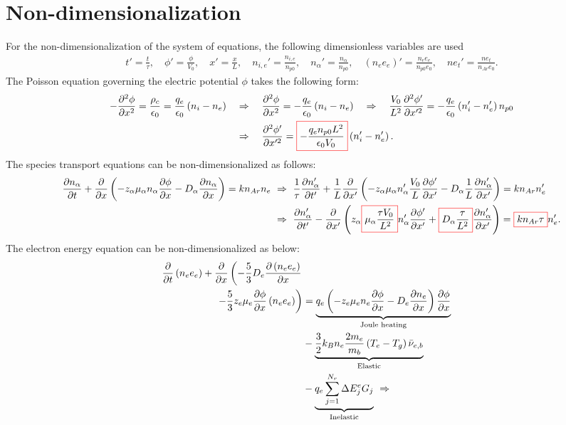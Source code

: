 \appendix
\chapter{Non-dimensionalization}

For the non-dimensionalization of the system of equations, the following dimensionless variables are used
%
\begin{align*}
t' = \frac{t}{\tau}, \quad \phi' = \frac{\phi}{V_0}, \quad x' = \frac{x}{L},  \quad n_{i,e}' = \frac{n_{i,e}}{n_{p0}}, \quad n_{\alpha}' = \frac{n_{\alpha}}{n_{p0}}, \quad \left(n_{e}e_{e}\right)' = \frac{n_{e}e_{e}}{n_{p0} e_0}, \quad ne_t' = \frac{ne_t}{n_{Ar} e_0}.
\end{align*}
%
The Poisson equation governing the
electric potential $\phi$ takes the following form:
%
\begin{align*}
-\frac{\partial ^2\phi}{\partial x^2} = \frac{\rho_c}{\epsilon_0} = \frac{q_e}{\epsilon_0} \left(n_i - n_e\right) \quad &\Rightarrow \quad \frac{\partial ^2\phi}{\partial x^2} = - \frac{q_e}{\epsilon_0} \left(n_i - n_e\right) \quad \Rightarrow \quad \frac{V_0}{L^2}\frac{\partial ^2\phi'}{\partial x'^2} = - \frac{q_e}{\epsilon_0} \left(n_i' - n_e'\right) n_{p0} \\
\quad &\Rightarrow \quad \frac{\partial ^2\phi'}{\partial x'^2} = \color{red}\boxed{\color{black} - \frac{q_e n_{p0} L^2}{\epsilon_0 V_0}} \color{black}\left(n_i' - n_e'\right) .
\end{align*}
%
The species transport equations can be non-dimensionalized as follows:
%
\begin{align*}
\frac{\partial n_{\alpha}}{\partial t} + \frac{\partial }{\partial x} \left( - z_{\alpha} \mu_{\alpha} n_{\alpha} \frac{\partial \phi}{\partial x} - D_{\alpha} \frac{\partial n_{\alpha}}{\partial x}\right)= k n_{Ar} n_{e}  \ &\Rightarrow \ \frac{1}{\tau}\frac{\partial n_{\alpha}'}{\partial t'} +  \frac{1}{L}\frac{\partial }{\partial x'} \left( - z_{\alpha} \mu_{\alpha} n_{\alpha}' \frac{V_0}{L}\frac{\partial \phi'}{\partial x'} - D_{\alpha} \frac{1}{L} \frac{\partial n_{\alpha}'}{\partial x'}\right) = k n_{Ar} n_{e}' \\
\ &\Rightarrow \ \frac{\partial n_{\alpha}'}{\partial t'} - \frac{\partial }{\partial x'} \left( z_{\alpha} \color{red}\boxed{\color{black} \mu_{\alpha} \frac{\tau V_0}{L^2} } \color{black} n_{\alpha}'\frac{\partial \phi'}{\partial x'} + \color{red}\boxed{\color{black} D_{\alpha} \frac{\tau}{L^2}} \color{black}  \frac{\partial n_{\alpha}'}{\partial x'}\right) = \color{red}\boxed{\color{black} k n_{Ar} \tau } \color{black} n_{e}' .
\label{eqn:species}
\end{align*}
%
The electron energy equation can be non-dimensionalized as below:
%
\begin{align*}
\frac{\partial }{\partial t} \left( n_e e_e \right)
+
\frac{\partial }{\partial x} \left( - \frac{5}{3} D_e \frac{\partial \left(n_e e_e\right)}{\partial x} \right. \\
\left. - \frac{5}{3}  z_e \mu_e \frac{\partial \phi}{\partial x} \left(n_e e_e\right) \right)
&=
\underbrace{q_e \left(-z_{e} \mu_{e} n_{e} \frac{\partial \phi}{\partial x} - D_{e} \frac{\partial n_{e}}{\partial x} \right) \frac{\partial \phi}{\partial x}}_{\textrm{Joule heating}} \\
&-
\underbrace{\frac{3}{2} k_B n_e \frac{2 m_e}{m_b} \left( T_e - T_g \right) \bar{\nu}_{e,b}}_{\textrm{Elastic}} \\
&-
\underbrace{q_e \sum_{j=1}^{N_r} \Delta E^e_j G_j}_{\textrm{Inelastic}} \ \Rightarrow
\end{align*}
